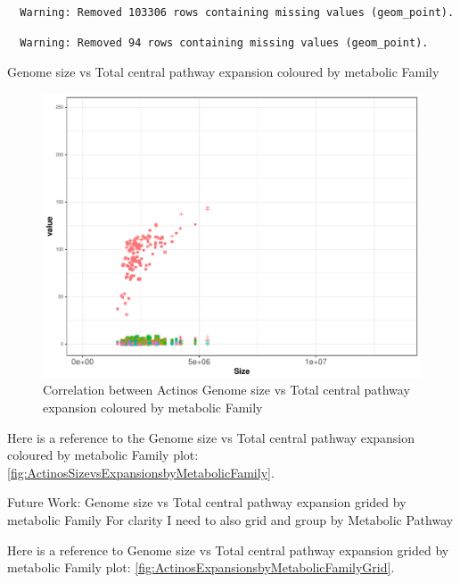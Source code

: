 \documentclass[12pt,twoside]{reedthesis}
\begin{document}
  \begin{verbatim}
  Warning: Removed 103306 rows containing missing values (geom_point).
  \end{verbatim}
  
  \begin{verbatim}
  Warning: Removed 94 rows containing missing values (geom_point).
  \end{verbatim}
  
  Genome size vs Total central pathway expansion coloured by metabolic
  Family
  
  \begin{figure}[h!tbp]
  \centering
  \includegraphics[angle = 0,scale = 0.6]{chapter2/Actinobacteria/ActinosSizevsExpansionsbyMetabolicFamily.pdf}
  \caption[Correlation between Actinos Genome size vs Total central pathway expansion coloured by metabolic Family]{\normalsize{Correlation between Actinos Genome size vs Total central pathway expansion coloured by metabolic Family}}
  \label{fig:ActinosSizevsExpansionsbyMetabolicFamily}
  \end{figure}
  
  Here is a reference to the Genome size vs Total central pathway
  expansion coloured by metabolic Family plot:
  \autoref{fig:ActinosSizevsExpansionsbyMetabolicFamily}. \clearpage 
  
  Future Work: Genome size vs Total central pathway expansion grided by
  metabolic Family For clarity I need to also grid and group by Metabolic
  Pathway
  
  Here is a reference to Genome size vs Total central pathway expansion
  grided by metabolic Family plot:
  \autoref{fig:ActinosExpansionsbyMetabolicFamilyGrid}. \clearpage 
  
\end{document}
